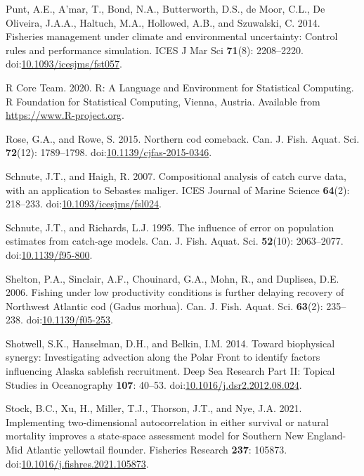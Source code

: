 \documentclass[]{article}
\begin{document}
\leavevmode\hypertarget{ref-punt2014Fisheries}{}%
Punt, A.E., A'mar, T., Bond, N.A., Butterworth, D.S., de Moor, C.L., De
Oliveira, J.A.A., Haltuch, M.A., Hollowed, A.B., and Szuwalski, C. 2014.
Fisheries management under climate and environmental uncertainty:
Control rules and performance simulation. ICES J Mar Sci \textbf{71}(8):
2208--2220.
doi:\href{https://doi.org/10.1093/icesjms/fst057}{10.1093/icesjms/fst057}.

\leavevmode\hypertarget{ref-rcoreteam2020Language}{}%
R Core Team. 2020. R: A Language and Environment for Statistical
Computing. R Foundation for Statistical Computing, Vienna, Austria.
Available from \url{https://www.R-project.org}.

\leavevmode\hypertarget{ref-rose2015Northern}{}%
Rose, G.A., and Rowe, S. 2015. Northern cod comeback. Can. J. Fish.
Aquat. Sci. \textbf{72}(12): 1789--1798.
doi:\href{https://doi.org/10.1139/cjfas-2015-0346}{10.1139/cjfas-2015-0346}.

\leavevmode\hypertarget{ref-schnute2007Compositional}{}%
Schnute, J.T., and Haigh, R. 2007. Compositional analysis of catch curve
data, with an application to Sebastes maliger. ICES Journal of Marine
Science \textbf{64}(2): 218--233.
doi:\href{https://doi.org/10.1093/icesjms/fsl024}{10.1093/icesjms/fsl024}.

\leavevmode\hypertarget{ref-schnute1995Influence}{}%
Schnute, J.T., and Richards, L.J. 1995. The influence of error on
population estimates from catch-age models. Can. J. Fish. Aquat. Sci.
\textbf{52}(10): 2063--2077.
doi:\href{https://doi.org/10.1139/f95-800}{10.1139/f95-800}.

\leavevmode\hypertarget{ref-shelton2006Fishing}{}%
Shelton, P.A., Sinclair, A.F., Chouinard, G.A., Mohn, R., and Duplisea,
D.E. 2006. Fishing under low productivity conditions is further delaying
recovery of Northwest Atlantic cod (Gadus morhua). Can. J. Fish. Aquat.
Sci. \textbf{63}(2): 235--238.
doi:\href{https://doi.org/10.1139/f05-253}{10.1139/f05-253}.

\leavevmode\hypertarget{ref-shotwell2014Biophysical}{}%
Shotwell, S.K., Hanselman, D.H., and Belkin, I.M. 2014. Toward
biophysical synergy: Investigating advection along the Polar Front to
identify factors influencing Alaska sablefish recruitment. Deep Sea
Research Part II: Topical Studies in Oceanography \textbf{107}: 40--53.
doi:\href{https://doi.org/10.1016/j.dsr2.2012.08.024}{10.1016/j.dsr2.2012.08.024}.

\leavevmode\hypertarget{ref-stock2021Implementing}{}%
Stock, B.C., Xu, H., Miller, T.J., Thorson, J.T., and Nye, J.A. 2021.
Implementing two-dimensional autocorrelation in either survival or
natural mortality improves a state-space assessment model for Southern
New England-Mid Atlantic yellowtail flounder. Fisheries Research
\textbf{237}: 105873.
doi:\href{https://doi.org/10.1016/j.fishres.2021.105873}{10.1016/j.fishres.2021.105873}.
\end{document}
